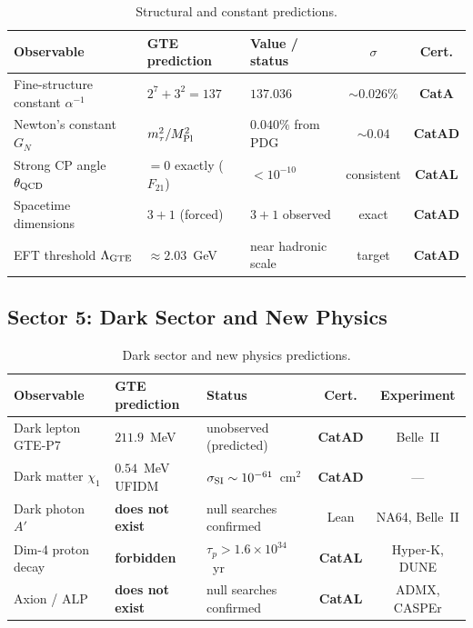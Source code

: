 \documentclass[11pt,a4paper]{article}
\newcommand{\CatAL}{\textbf{CatAL}}
\newcommand{\CatAD}{\textbf{CatAD}}
\newcommand{\CatA}{\textbf{CatA}}
\begin{document}
\begin{table}[htbp]
\centering
\caption{Structural and constant predictions.}
\label{tab:constants}
\setlength{\tabcolsep}{4pt}
\begin{tabular}{lllcc}
\toprule
Observable & GTE prediction & Value / status & $\sigma$ & Cert. \\
\midrule
Fine-structure constant $\alpha^{-1}$ & $2^7 + 3^2 = 137$ & $137.036$ & $\sim 0.026\%$ & \CatA \\
Newton's constant $G_N$ & $m_\tau^2/M_{\rm Pl}^2$ & $0.040\%$ from PDG & $\sim 0.04$ & \CatAD \\
Strong CP angle $\theta_{\rm QCD}$ & $= 0$ exactly ($F_{21}$) & $< 10^{-10}$ & consistent & \CatAL \\
Spacetime dimensions & $3+1$ (forced) & $3+1$ observed & exact & \CatAD \\
EFT threshold $\Lambda_{\rm GTE}$ & $\approx 2.03$~GeV & near hadronic scale & target & \CatAD \\
\bottomrule
\end{tabular}
\end{table}

\subsection{Sector 5: Dark Sector and New Physics}

\begin{table}[htbp]
\centering
\caption{Dark sector and new physics predictions.}
\label{tab:dark}
\setlength{\tabcolsep}{4pt}
\begin{tabular}{lllcc}
\toprule
Observable & GTE prediction & Status & Cert. & Experiment \\
\midrule
Dark lepton GTE-P7 & $211.9$~MeV & unobserved (predicted) & \CatAD & Belle~II \\
Dark matter $\chi_1$ & $0.54$~MeV UFIDM & $\sigma_{\rm SI} \sim 10^{-61}$~cm$^2$ & \CatAD & --- \\
Dark photon $A'$ & \textbf{does not exist} & null searches confirmed & Lean & NA64, Belle~II \\
Dim-4 proton decay & \textbf{forbidden} & $\tau_p > 1.6 \times 10^{34}$~yr & \CatAL & Hyper-K, DUNE \\
Axion / ALP & \textbf{does not exist} & null searches confirmed & \CatAL & ADMX, CASPEr \\
\bottomrule
\end{tabular}
\end{table}
\end{document}
